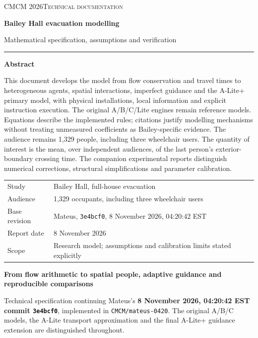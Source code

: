 \documentclass[11pt,a4paper]{article}
\newcommand{\code}[1]{{\small\nolinkurl{#1}}}
\begin{document}
\begin{titlepage}
\thispagestyle{empty}
{\small\scshape CMCM 2026\quad Technical documentation}\par
\vspace{22mm}
{\Huge\bfseries Bailey Hall evacuation modelling\par}
\vspace{7mm}
{\Large Mathematical specification, assumptions and verification\par}
\vspace{12mm}
{\color{ink}\rule{\linewidth}{0.7pt}}\par
\vspace{5mm}
\textbf{Abstract}\par
This document develops the model from flow conservation and travel times to heterogeneous agents, spatial interactions, imperfect guidance and the A-Lite+ primary model, with physical installations, local information and explicit instruction execution. The original A/B/C/Lite engines remain reference models. Equations describe the implemented rules; citations justify modelling mechanisms without treating unmeasured coefficients as Bailey-specific evidence. The audience remains 1,329 people, including three wheelchair users. The quantity of interest is the mean, over independent audiences, of the last person's exterior-boundary crossing time. The companion experimental reports distinguish numerical corrections, structural simplifications and parameter calibration.
\vfill
\begin{tabular}{@{}ll@{}}
Study & Bailey Hall, full-house evacuation\\
Audience & 1,329 occupants, including three wheelchair users\\
Base revision & Mateus, \texttt{3e4bcf0}, 8 November 2026, 04:20:42 EST\\
Report date & 8 November 2026\\
Scope & Research model; assumptions and calibration limits stated explicitly
\end{tabular}
\vspace{9mm}
\end{titlepage}
{\small\tableofcontents}
\clearpage
{}
\textbf{From flow arithmetic to spatial people, adaptive guidance and reproducible comparisons}


Technical specification continuing Mateus's \textbf{8 November 2026, 04:20:42 EST commit \code{3e4bcf0}}, implemented in \code{CMCM/mateus-0420}. The original A/B/C models, the A-Lite transport approximation and the final A-Lite+ guidance extension are distinguished throughout.
\end{document}
